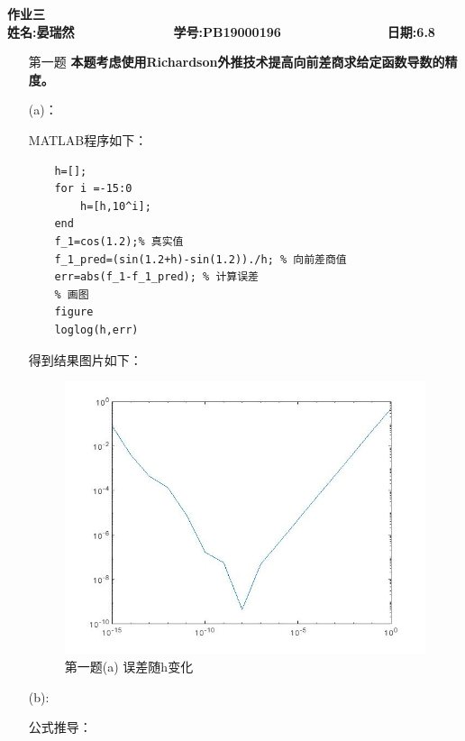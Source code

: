 \documentclass[12pt,a4paper,utf8]{ctexart}
\begin{document}


\begin{center}
\textbf{作业三}\\
\textbf{姓名:晏瑞然~~~~~~~~~~~~~ 学号:PB19000196~~~~~~~~~~~~~~ 日期:6.8}\\
\end{center}

\begin{center}
\fbox{
\begin{minipage}{40em}
\vspace{5cm}
\hspace{20cm}
\end{minipage}}
\end{center}
\vspace{1cm}

\begin{enumerate}
\item[第一题] \textbf{本题考虑使用Richardson外推技术提高向前差商求给定函数导数的精度。}  

(a)：

MATLAB程序如下：
\begin{lstlisting}[frame=single]
    % 初始化h
    h=[];
    for i =-15:0
        h=[h,10^i];
    end
    f_1=cos(1.2);% 真实值
    f_1_pred=(sin(1.2+h)-sin(1.2))./h; % 向前差商值
    err=abs(f_1-f_1_pred); % 计算误差
    % 画图
    figure
    loglog(h,err)
    \end{lstlisting}

得到结果图片如下：
\begin{figure}[H]
    \centering
    \includegraphics[width=15cm,height=8cm]{ex1a.jpg}
    \caption{第一题(a) 误差随h变化}
 \end{figure}


(b):

公式推导：


\end{enumerate}
\end{document}
